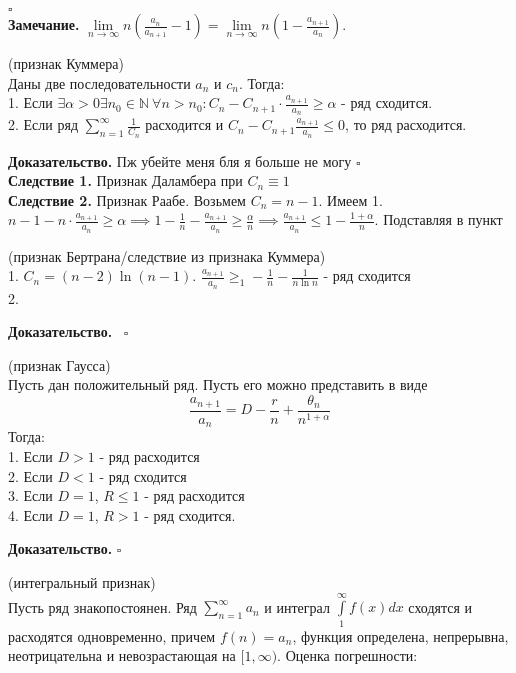 $\square$\\
\textbf{Замечание.} 
$\lim\limits_{n \to \infty}n(\frac{a_n}{a_{n+1}}-1)=
\lim\limits_{n \to \infty}n(1-\frac{a_{n+1}}{a_n})$.
\begin{theor}
    (признак Куммера)\\
    Даны две последовательности $a_n$ и  $c_n$. Тогда:\\
    1. Если $\exists \alpha>0\exists n_0\in\mathbb{N}~\forall n>n_0:
    C_n-C_{n+1}\cdot \frac{a_{n+1}}{a_n}\geqslant\alpha$ - ряд сходится.\\
    2. Если ряд $\sum\limits_{n=1}^{\infty} \frac{1}{C_n}$ расходится 
    и $C_n-C_{n+1} \frac{a_{n+1}}{a_n}\leqslant 0$, то ряд расходится.
\end{theor}
\textbf{Доказательство.} Пж убейте меня бля я больше не могу
$\square$ \\
\textbf{Следствие 1.} Признак Даламбера при $C_n\equiv1$\\
\textbf{Следствие 2.} Признак Раабе. Возьмем $C_n=n-1$. Имеем 
1. $n-1-n\cdot \frac{a_{n+1}}{a_n}\geqslant\alpha\implies1-\frac{1}{n}
-\frac{a_{n+1}}{a_n}\geqslant\frac{\alpha}{n}\implies\frac{a_{n+1}}{a_n}
\leqslant 1-\frac{1+\alpha}{n}$. Подставляя в пункт  
\begin{theor}
    (признак Бертрана/следствие из признака Куммера)\\
    1. $C_n=(n-2)\ln(n-1)$. $\frac{a_{n+1}}{a_n}\geqslant_1-\frac{1}{n}
    -\frac{1}{n\ln{n}}$ - ряд сходится\\
    2. 

\end{theor}
\textbf{Доказательство.}  \
$\square$ 
\begin{theor}
    (признак Гаусса)\\
    Пусть дан положительный ряд. Пусть его можно представить в виде
    $$\frac{a_{n+1}}{a_n}=D-\frac{r}{n}+ \frac{\theta_n}{n^{1+\alpha}}$$ 
    Тогда:\\
    1. Если $D>1$ - ряд расходится\\
    2. Если $D<1$ - ряд сходится\\
    3. Если $D=1$,  $R\leqslant 1$ - ряд расходится\\
    4. Если $D=1$,  $R>1$ - ряд сходится. 
\end{theor}
\textbf{Доказательство.}
$\square$ 
\begin{theor}
    (интегральный признак)\\
    Пусть ряд знакопостоянен. 
    Ряд $\sum\limits_{n=1}^{\infty} a_n$ и интеграл $\int\limits^\infty_1
    f(x)dx$ сходятся и расходятся одновременно, причем $f(n)=a_n$, функция
    определена, непрерывна, неотрицательна и невозрастающая на  $[1,\infty)$.
    Оценка погрешности: 

\end{theor}
